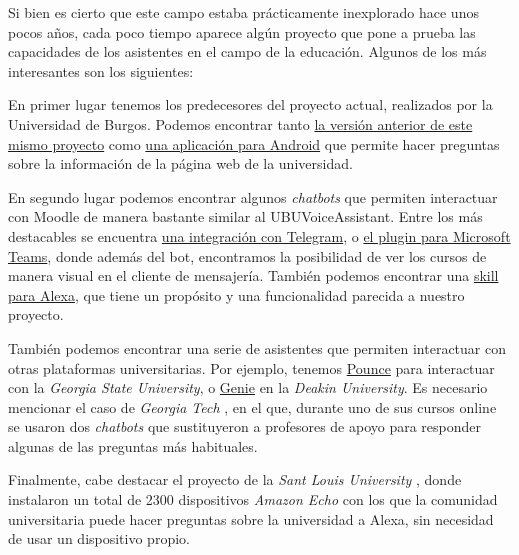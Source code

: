 
Si bien es cierto que este campo estaba prácticamente inexplorado hace unos pocos años, cada poco tiempo aparece algún proyecto que pone a prueba las capacidades de los asistentes en el campo de la educación. Algunos de los más interesantes son los siguientes:

En primer lugar tenemos los predecesores del proyecto actual, realizados por la Universidad de Burgos. Podemos encontrar tanto \href{https://github.com/adp1002/UBUVoiceAssistant}{la versión anterior de este mismo proyecto} como \href{https://github.com/cgc0045/TFG-UBUassistant}{una aplicación para Android} que permite hacer preguntas sobre la información de la página web de la universidad.

En segundo lugar podemos encontrar algunos \textit{chatbots} que permiten interactuar con Moodle de manera bastante similar al UBUVoiceAssistant. Entre los más destacables se encuentra \href{https://github.com/AnyTimeTraveler/moodlebot}{una integración con Telegram}, o \href{https://education.microsoft.com/en-us/resource/3dffb3a8}{el plugin para Microsoft Teams}, donde además del bot, encontramos la posibilidad de ver los cursos de manera visual en el cliente de mensajería. También podemos encontrar una \href{http://libres.uncg.edu/ir/asu/f/Melton_Michelle_2019_Thesis.pdf}{skill para Alexa}, que tiene un propósito y una funcionalidad parecida a nuestro proyecto.

También podemos encontrar una serie de asistentes que permiten interactuar con otras plataformas universitarias. Por ejemplo, tenemos \href{https://www.admithub.com/case-study/how-georgia-state-university-supports-every-student-with-personalized-text-messaging/}{Pounce} para interactuar con la \textit{Georgia State University}, o \href{https://www.youtube.com/watch?v=zsRPuU53E74}{Genie} en la \textit{Deakin University}. Es necesario mencionar el caso de \textit{Georgia Tech} \cite{georgiatech}, en el que, durante uno de sus cursos online se usaron dos \textit{chatbots} que sustituyeron a profesores de apoyo para responder algunas de las preguntas más habituales.

Finalmente, cabe destacar el proyecto de la \textit{Sant Louis University} \cite{alexauni}, donde instalaron un total de 2300 dispositivos \textit{Amazon Echo} con los que la comunidad universitaria puede hacer preguntas sobre la universidad a Alexa, sin necesidad de usar un dispositivo propio.

